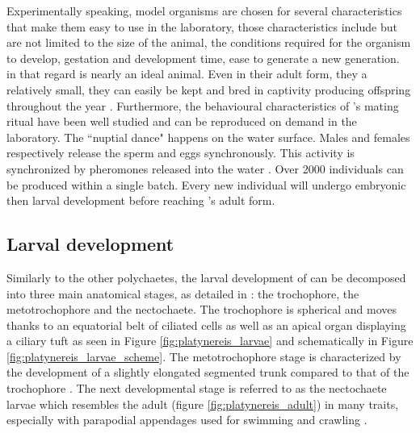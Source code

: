      Experimentally speaking, model organisms are chosen for several characteristics that make them easy to use in the laboratory, those characteristics include but are not limited to the size of the animal, the conditions required for the organism to develop, gestation and development time, ease to generate a new generation.\\
     
     in that regard \platy{} is nearly an ideal animal. Even in their adult form, they a relatively small, they can easily be kept and bred in captivity producing offspring throughout the year \cite{fischer04}. Furthermore, the behavioural characteristics of \platy{}'s mating ritual have been well studied and can be reproduced on demand in the laboratory. The ``nuptial dance" happens on the water surface. Males and females respectively release the sperm and eggs synchronously. This activity is synchronized by pheromones released into the water \cite{zeeck98}. Over 2000 individuals can be produced within a single batch. Every new individual will undergo embryonic then larval development before reaching \platy{}'s adult form.\\

 
     \subsection{Larval development}
    Similarly to the other polychaetes, the larval development of \platy{} can be decomposed into three main anatomical stages, as detailed in \cite{hauenschild69}: the trochophore, the metotrochophore and the nectochaete. The trochophore is spherical and moves thanks to an equatorial belt of ciliated cells as well as an apical organ displaying a ciliary tuft \cite{rouse99,nielsen04} as seen in Figure \ref{fig:platynereis_larvae} and schematically in Figure \ref{fig:platynereis_larvae_scheme}. The metotrochophore stage is characterized by the development of a slightly elongated segmented trunk compared to that of the trochophore \cite{hacker98}. The next developmental stage is referred to as the nectochaete larvae which resembles the adult (figure \ref{fig:platynereis_adult}) in many traits, especially with parapodial appendages used for swimming and crawling \cite{hacker98}.\\
    
